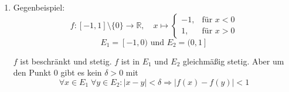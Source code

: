 \documentclass[a4paper,12pt]{article}
\begin{document}
\begin{enumerate}[label=\alph*)]
    \item

          Gegenbeispiel:
          \[
              f : [-1, 1] \setminus \{0\} \to \mathbb{R}, \quad x \mapsto \begin{cases} -1, & \text{für } x < 0 \\ 1, & \text{für } x > 0 \end{cases}
          \]
          \[
              E_1 = [-1, 0) \text{ und } E_2 = (0, 1]
          \]

          $f$ ist beschränkt und stetig. $f$ ist in $E_1$ und $E_2$ gleichmäßig stetig. Aber um den Punkt $0$ gibt es kein $\delta > 0$ mit
          \[
              \forall x \in E_1 \; \forall y \in E_2 : |x - y| < \delta \Rightarrow |f(x) - f(y)| < 1
          \]

\end{enumerate}
\end{document}
